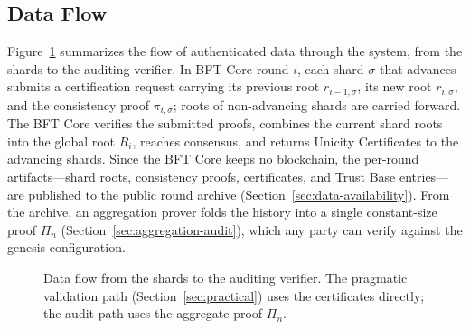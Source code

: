 \documentclass[11pt]{article}
\begin{document}
\subsection{Data Flow}
\label{sec:data-flow}

Figure~\ref{fig:dataflow} summarizes the flow of authenticated data through the system, from the shards to the auditing verifier. In BFT Core round $i$, each shard $\sigma$ that advances submits a certification request carrying its previous root $r_{i-1,\sigma}$, its new root $r_{i,\sigma}$, and the consistency proof $\pi_{i,\sigma}$; roots of non-advancing shards are carried forward. The BFT Core verifies the submitted proofs, combines the current shard roots into the global root $R_i$, reaches consensus, and returns Unicity Certificates to the advancing shards. Since the BFT Core keeps no blockchain, the per-round artifacts---shard roots, consistency proofs, certificates, and Trust Base entries---are published to the public round archive (Section~\ref{sec:data-availability}). From the archive, an aggregation prover folds the history into a single constant-size proof $\Pi_n$ (Section~\ref{sec:aggregation-audit}), which any party can verify against the genesis configuration.

\begin{figure}[!htbp]
    \centering
{}
    \caption{Data flow from the shards to the auditing verifier. The pragmatic validation path (Section~\ref{sec:practical}) uses the certificates directly; the audit path uses the aggregate proof $\Pi_n$.}\label{fig:dataflow}
\end{figure}
\end{document}
